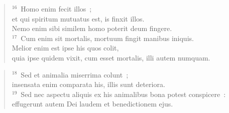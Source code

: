 \begin{flushleft}
\begin{verse}
${}^{16}$~Homo enim fecit illos~;\\ et qui spiritum mutuatus est, is finxit illos.\\ Nemo enim sibi similem homo poterit deum fingere.\\
${}^{17}$~Cum enim sit mortalis, mortuum fingit manibus iniquis.\\ Melior enim est ipse his quos colit,\\ quia ipse quidem vixit, cum esset mortalis, illi autem numquam.\end{verse}\end{flushleft}


\begin{flushleft}\begin{verse}${}^{18}$~Sed et animalia miserrima colunt~;\\ insensata enim comparata his, illis sunt deteriora.\\
${}^{19}$~Sed nec aspectu aliquis ex his animalibus bona potest conspicere~:\\ effugerunt autem Dei laudem et benedictionem ejus.\end{verse}\end{flushleft}


